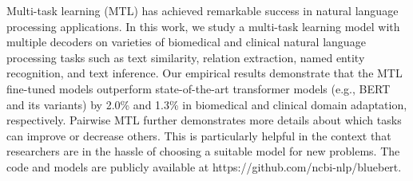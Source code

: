 Multi-task learning (MTL) has achieved remarkable success in natural language processing applications. In this work, we study a multi-task learning model with multiple decoders on varieties of biomedical and clinical natural language processing tasks such as text similarity, relation extraction, named entity recognition, and text inference. Our empirical results demonstrate that the MTL fine-tuned models outperform state-of-the-art transformer models (e.g., BERT and its variants) by 2.0\% and 1.3\% in biomedical and clinical domain adaptation, respectively. Pairwise MTL further demonstrates more details about which tasks can improve or decrease others. This is particularly helpful in the context that researchers are in the hassle of choosing a suitable model for new problems. The code and models are publicly available at https://github.com/ncbi-nlp/bluebert.
